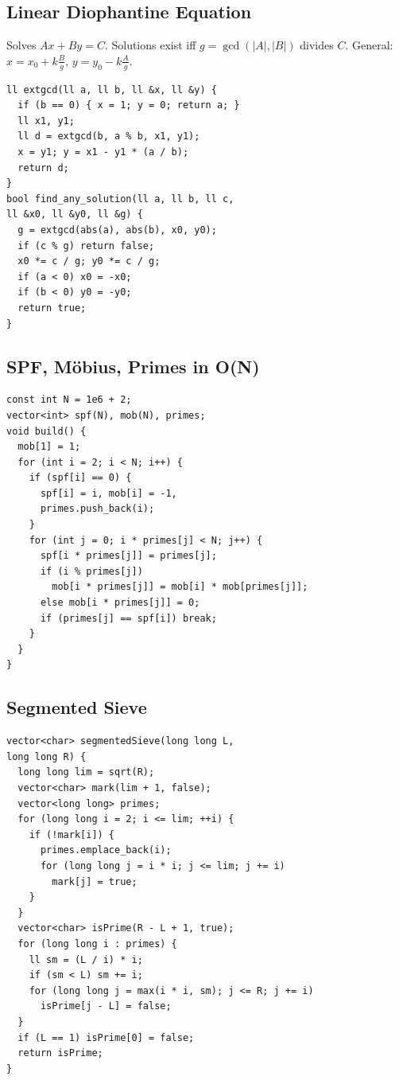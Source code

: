 \subsection{Linear Diophantine Equation}
Solves $Ax + By = C$. Solutions exist iff
$g = \gcd(|A|, |B|)$ divides $C$.
General: $x = x_0 + k \frac{B}{g}$, $y = y_0 - k \frac{A}{g}$.
\begin{verbatim}
ll extgcd(ll a, ll b, ll &x, ll &y) {
  if (b == 0) { x = 1; y = 0; return a; }
  ll x1, y1;
  ll d = extgcd(b, a % b, x1, y1);
  x = y1; y = x1 - y1 * (a / b);
  return d;
}
bool find_any_solution(ll a, ll b, ll c,
ll &x0, ll &y0, ll &g) {
  g = extgcd(abs(a), abs(b), x0, y0);
  if (c % g) return false;
  x0 *= c / g; y0 *= c / g;
  if (a < 0) x0 = -x0;
  if (b < 0) y0 = -y0;
  return true;
}
\end{verbatim}
\subsection{SPF, Möbius, Primes in O(N)}
\begin{verbatim}
const int N = 1e6 + 2;
vector<int> spf(N), mob(N), primes;
void build() {
  mob[1] = 1;
  for (int i = 2; i < N; i++) {
    if (spf[i] == 0) {
      spf[i] = i, mob[i] = -1,
      primes.push_back(i);
    }
    for (int j = 0; i * primes[j] < N; j++) {
      spf[i * primes[j]] = primes[j];
      if (i % primes[j])
        mob[i * primes[j]] = mob[i] * mob[primes[j]];
      else mob[i * primes[j]] = 0;
      if (primes[j] == spf[i]) break;
    }
  }
}
\end{verbatim}
\subsection{Segmented Sieve}
\begin{verbatim}
vector<char> segmentedSieve(long long L,
long long R) {
  long long lim = sqrt(R);
  vector<char> mark(lim + 1, false);
  vector<long long> primes;
  for (long long i = 2; i <= lim; ++i) {
    if (!mark[i]) {
      primes.emplace_back(i);
      for (long long j = i * i; j <= lim; j += i)
        mark[j] = true;
    }
  }
  vector<char> isPrime(R - L + 1, true);
  for (long long i : primes) {
    ll sm = (L / i) * i;
    if (sm < L) sm += i;
    for (long long j = max(i * i, sm); j <= R; j += i)
      isPrime[j - L] = false;
  }
  if (L == 1) isPrime[0] = false;
  return isPrime;
}
\end{verbatim}
